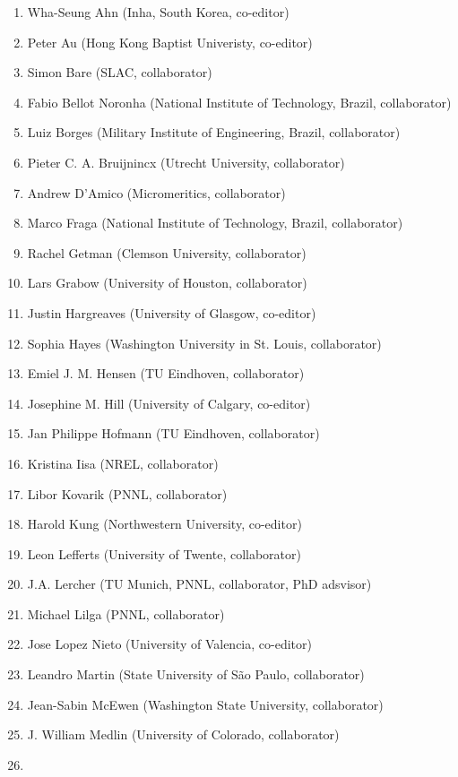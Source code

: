 \begin{enumerate}
\item
  Wha-Seung Ahn (Inha, South Korea, co-editor)
\item
  Peter Au (Hong Kong Baptist Univeristy, co-editor)
\item
  Simon Bare (SLAC, collaborator)
\item
  Fabio Bellot Noronha (National Institute of Technology, Brazil,
  collaborator)
\item
  Luiz Borges (Military Institute of Engineering, Brazil, collaborator)
\item
  Pieter C. A. Bruijnincx (Utrecht University, collaborator)
\item
  Andrew D'Amico (Micromeritics, collaborator)
\item
  Marco Fraga (National Institute of Technology, Brazil, collaborator)
\item
  Rachel Getman (Clemson University, collaborator)
\item
  Lars Grabow (University of Houston, collaborator)
\item
  Justin Hargreaves (University of Glasgow, co-editor)
\item
  Sophia Hayes (Washington University in St. Louis, collaborator)
\item
  Emiel J. M. Hensen (TU Eindhoven, collaborator)
\item
  Josephine M. Hill (University of Calgary, co-editor)
\item
  Jan Philippe Hofmann (TU Eindhoven, collaborator)
\item
  Kristina Iisa (NREL, collaborator)
\item
  Libor Kovarik (PNNL, collaborator)
\item
  Harold Kung (Northwestern University, co-editor)
\item
  Leon Lefferts (University of Twente, collaborator)
\item
  J.A. Lercher (TU Munich, PNNL, collaborator, PhD adsvisor)
\item
  Michael Lilga (PNNL, collaborator)
\item
  Jose Lopez Nieto (University of Valencia, co-editor)
\item
  Leandro Martin (State University of São Paulo, collaborator)
\item
  Jean-Sabin McEwen (Washington State University, collaborator)
\item
  J. William Medlin (University of Colorado, collaborator)
\item

\end{enumerate}
